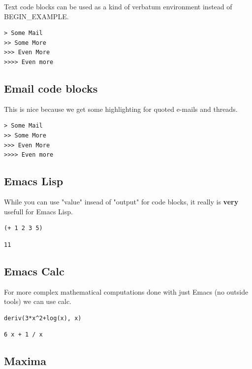 \documentclass[11pt]{article}
\begin{document}
Text code blocks can be used as a kind of verbatum environment instead of BEGIN\_EXAMPLE.

\begin{verbatim}
> Some Mail
>> Some More
>>> Even More
>>>> Even more
\end{verbatim}

\subsection{Email code blocks}
\label{sec:orgbc9a545}

This is nice because we get some highlighting for quoted e-mails and threads.

\begin{verbatim}
> Some Mail
>> Some More
>>> Even More
>>>> Even more
\end{verbatim}

\subsection{Emacs Lisp}
\label{sec:org75d4c68}

While you can use "value" insead of "output" for code blocks, it really is \textbf{very} usefull for Emacs Lisp.

\begin{verbatim}
(+ 1 2 3 5)
\end{verbatim}

\begin{verbatim}
11
\end{verbatim}

\subsection{Emacs Calc}
\label{sec:org2b2552f}

For more complex mathematical computations done with just Emacs (no outside tools) we can use calc.

\begin{verbatim}
deriv(3*x^2+log(x), x)
\end{verbatim}

\begin{verbatim}
6 x + 1 / x
\end{verbatim}

\subsection{Maxima}
\label{sec:org3bdb521}
\end{document}
